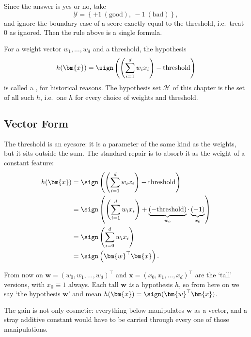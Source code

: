 Since the answer is yes or no, take
\[
    \mathcal{Y} = \left\{ +1 \ (\text{good}),\ -1 \ (\text{bad}) \right\},
\]
and ignore the boundary case of a score exactly equal to the threshold, i.e.\
treat \(0\) as ignored. Then the rule above is a single formula.

\begin{definition}[Perceptron]\label{def:perceptron}
    For a weight vector \(w_1, \dots , w_d\) and a threshold, the hypothesis
    \[
        h(\bm{x}) = \sign \left( \left( \sum_{i=1}^d w_i x_i \right)
        - \text{threshold} \right)
    \]
    is called a , for historical reasons. The hypothesis set
    \(\mathcal{H}\) of this chapter is the set of all such \(h\), i.e.\ one
    \(h\) for every choice of weights and threshold.
\end{definition}

\subsection{Vector Form}

The threshold is an eyesore: it is a parameter of the same kind as the weights,
but it sits outside the sum. The standard repair is to absorb it as the weight
of a constant feature:
\begin{align*}
    h(\bm{x}) &= \sign \left( \left( \sum_{i=1}^d w_i x_i \right)
        - \text{threshold} \right)\\
    &= \sign \left( \left( \sum_{i=1}^d w_i x_i \right)
        + \underbrace{(-\text{threshold})}_{w_0} \cdot
        \underbrace{(+1)}_{x_0} \right)\\
    &= \sign \left( \sum_{i=0}^d w_i x_i \right)\\
    &= \sign \left( \bm{w}^\top \bm{x} \right).
\end{align*}

\begin{notation}
    From now on \(\bm{w} = (w_0, w_1, \dots , w_d)^\top\) and
    \(\bm{x} = (x_0, x_1, \dots , x_d)^\top\) are the `tall' versions, with
    \(x_0 \equiv 1\) always. Each tall \(\bm{w}\) \emph{is} a hypothesis \(h\),
    so from here on we say `the hypothesis \(\bm{w}\)' and mean
    \(h(\bm{x}) = \sign(\bm{w}^\top \bm{x})\).
\end{notation}

The gain is not only cosmetic: everything below manipulates \(\bm{w}\) as a
vector, and a stray additive constant would have to be carried through every
one of those manipulations.

